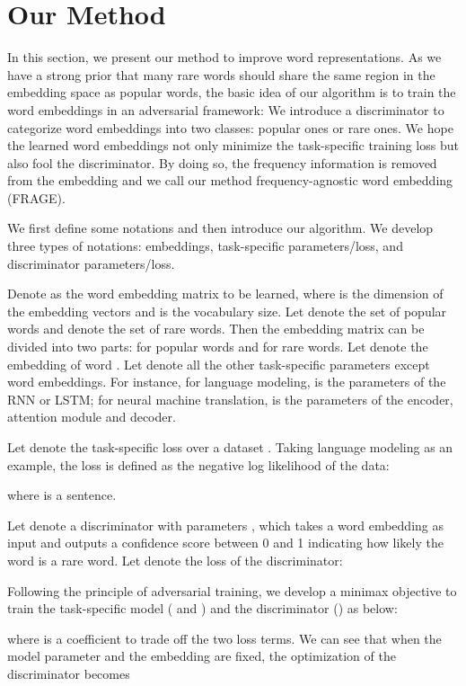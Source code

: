 \documentclass{article}
\begin{document}
\section{Our Method}
In this section, we present our method to improve word representations. As we have a strong prior that many rare words should share the same region in the embedding space as popular words, the basic idea of our algorithm is to train the word embeddings in an adversarial framework: We introduce a discriminator to categorize word embeddings into two classes: popular ones or rare ones. We hope the learned word embeddings not only minimize the task-specific training loss but also fool the discriminator. By doing so, the frequency information is removed from the embedding and we call our method frequency-agnostic word embedding (FRAGE).

We first define some notations and then introduce our algorithm. We develop three types of notations: embeddings, task-specific parameters/loss, and discriminator parameters/loss.

Denote  as the word embedding matrix to be learned, where  is the dimension of the embedding vectors and  is the vocabulary size. Let  denote the set of popular words and  denote the set of rare words. Then the embedding matrix  can be divided into two parts:  for popular words and  for rare words. Let  denote the embedding of word . Let  denote all the other task-specific parameters except word embeddings. For instance, for language modeling,  is the parameters of the RNN or LSTM; for neural machine translation,  is the parameters of the encoder, attention module and decoder.

Let  denote the task-specific loss over a dataset . Taking language modeling as an example, the loss  is defined as the negative log likelihood of the data:

where  is a sentence.

Let  denote a discriminator with parameters  , which takes a word embedding as input and outputs a confidence score between 0 and 1 indicating how likely the word is a rare word. Let  denote the loss of the discriminator:


Following the principle of adversarial training, we develop a minimax objective to train the task-specific model ( and ) and the discriminator () as below:

where  is a coefficient to trade off the two loss terms. We can see that when the model parameter  and the embedding  are fixed, the optimization of the discriminator  becomes
\end{document}
